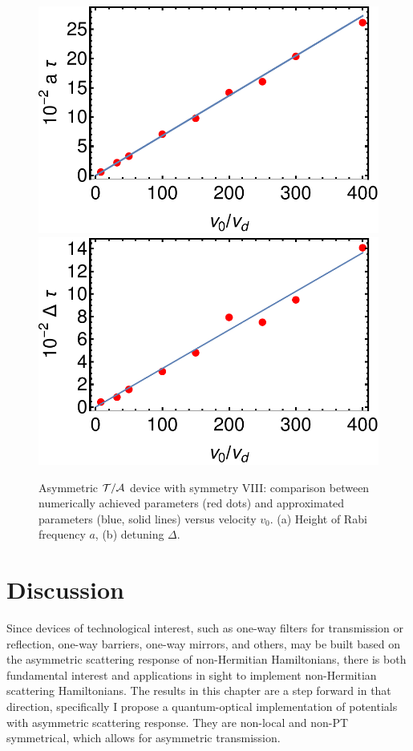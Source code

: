 \begin{figure}
  \begin{center}
  \includegraphics[width=0.48\linewidth]{Figures/asym_fig_t_a_param1.pdf}
  \includegraphics[width=0.48\linewidth]{Figures/asym_fig_t_a_param2.pdf}
  \end{center}
  \caption{Asymmetric ${\cal T/A}$ device with symmetry VIII: comparison between numerically achieved parameters (red dots) and approximated parameters (blue, solid lines) versus velocity $v_0$.
  (a) Height of Rabi frequency $a$, (b) detuning $\Delta$.
  \label{fig_t_a_param}}
\end{figure}

%
%
%
%

%
%
\section{Discussion\label{sec:chapter3_Discussion}}

Since devices of technological interest, such as one-way filters for transmission or reflection, one-way barriers, one-way mirrors, and others, may be built based on the asymmetric scattering response of non-Hermitian Hamiltonians, there is both fundamental
interest and applications in sight to implement non-Hermitian scattering Hamiltonians. The results in this chapter are a step forward in that direction, specifically I propose a quantum-optical implementation of potentials with asymmetric scattering response.
They are non-local and non-PT symmetrical, which allows for asymmetric transmission.

